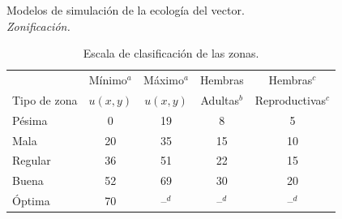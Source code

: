 \begin{frame}[c]{Modelos de simulación de la ecología del vector.\\\textit{Zonificación.}}
  \begin{table}
        \begin{minipage}{\textwidth}
            \caption{\label{tab:cap4-puntaje-zona} Escala de clasificación de las zonas.}
            \begin{tabular}{l c c c c}
                \hline
                             & Mínimo$^a$ & Máximo$^a$ & Hembras     & Hembras$^c$ \\
                Tipo de zona & $u(x,y)$   & $u(x,y)$   & Adultas$^b$ & Reproductivas$^c$ \\
                \hline
                \hline
                Pésima  & 0  & 19 & 8  & 5 \\
                Mala    & 20 & 35 & 15 & 10\\
                Regular & 36 & 51 & 22 & 15\\
                Buena   & 52 & 69 & 30 & 20\\
                Óptima  & 70 & --$^d$ & --$^d$ & --$^d$
            \end{tabular}
        \end{minipage}
    \end{table}
\end{frame}

